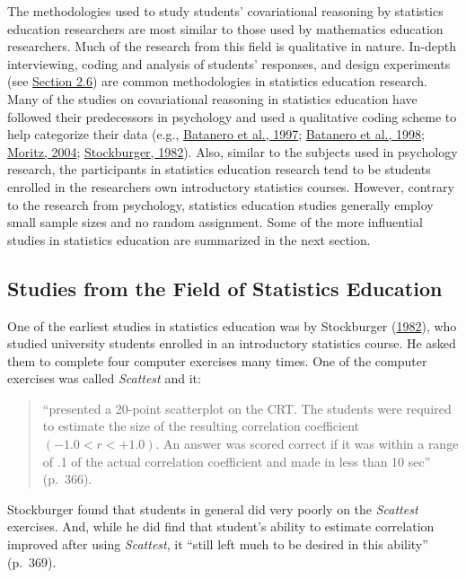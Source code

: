 \documentclass[11pt]{umnthesis}
\begin{document}
The methodologies used to study students' covariational reasoning by statistics education researchers are most similar to those used by mathematics education researchers. Much of the research from this field is qualitative in nature. In-depth interviewing, coding and analysis of students' responses, and design experiments (see \protect\hyperlink{design-exp}{Section 2.6}) are common methodologies in statistics education research. Many of the studies on covariational reasoning in statistics education have followed their predecessors in psychology and used a qualitative coding scheme to help categorize their data (e.g., \protect\hyperlink{ref-batanero:1997}{Batanero et al., 1997}; \protect\hyperlink{ref-batanero:1998}{Batanero et al., 1998}; \protect\hyperlink{ref-moritz:2004}{Moritz, 2004}; \protect\hyperlink{ref-stockburger:1982}{Stockburger, 1982}). Also, similar to the subjects used in psychology research, the participants in statistics education research tend to be students enrolled in the researchers own introductory statistics courses. However, contrary to the research from psychology, statistics education studies generally employ small sample sizes and no random assignment. Some of the more influential studies in statistics education are summarized in the next section.

\hypertarget{studies-from-the-field-of-statistics-education}{%
\subsection{Studies from the Field of Statistics Education}\label{studies-from-the-field-of-statistics-education}}

One of the earliest studies in statistics education was by Stockburger (\protect\hyperlink{ref-stockburger:1982}{1982}), who studied university students enrolled in an introductory statistics course. He asked them to complete four computer exercises many times. One of the computer exercises was called \emph{Scattest} and it:

\begin{quote}
``presented a 20-point scatterplot on the CRT. The students were required to estimate the size of the resulting correlation coefficient \((-1.0 < r < +1.0)\). An answer was scored correct if it was within a range of .1 of the actual correlation coefficient and made in less than 10 sec'' (p.~366).
\end{quote}

Stockburger found that students in general did very poorly on the \emph{Scattest} exercises. And, while he did find that student's ability to estimate correlation improved after using \emph{Scattest}, it ``still left much to be desired in this ability'' (p.~369).
\end{document}
